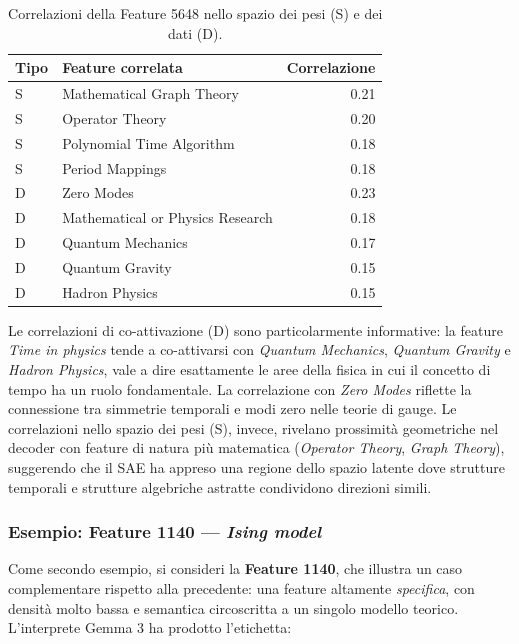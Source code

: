 \begin{table}[htbp]
    \centering
    \caption{Correlazioni della Feature 5648 nello spazio dei pesi (S) e dei dati (D).}
    \label{tab:feature_5648_corr}
    \begin{tabular}{@{}llr@{}}
        \toprule
        \textbf{Tipo} & \textbf{Feature correlata} & \textbf{Correlazione} \\
        \midrule
        S & Mathematical Graph Theory & 0.21 \\
        S & Operator Theory & 0.20 \\
        S & Polynomial Time Algorithm & 0.18 \\
        S & Period Mappings & 0.18 \\
        \midrule
        D & Zero Modes & 0.23 \\
        D & Mathematical or Physics Research & 0.18 \\
        D & Quantum Mechanics & 0.17 \\
        D & Quantum Gravity & 0.15 \\
        D & Hadron Physics & 0.15 \\
        \bottomrule
    \end{tabular}
\end{table}

Le correlazioni di co-attivazione (D) sono particolarmente informative: la feature \textit{Time in physics} tende a co-attivarsi con \textit{Quantum Mechanics}, \textit{Quantum Gravity} e \textit{Hadron Physics}, vale a dire esattamente le aree della fisica in cui il concetto di tempo ha un ruolo fondamentale. La correlazione con \textit{Zero Modes} riflette la connessione tra simmetrie temporali e modi zero nelle teorie di gauge. Le correlazioni nello spazio dei pesi (S), invece, rivelano prossimità geometriche nel decoder con feature di natura più matematica (\textit{Operator Theory}, \textit{Graph Theory}), suggerendo che il SAE ha appreso una regione dello spazio latente dove strutture temporali e strutture algebriche astratte condividono direzioni simili.

\subsubsection{Esempio: Feature 1140 --- \textit{Ising model}}
\label{subsubsec:feature_example_ising}
Come secondo esempio, si consideri la \textbf{Feature 1140}, che illustra un caso complementare rispetto alla precedente: una feature altamente \textit{specifica}, con densità molto bassa e semantica circoscritta a un singolo modello teorico. L'interprete Gemma 3 ha prodotto l'etichetta:

